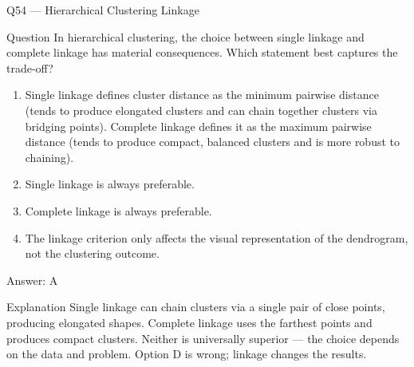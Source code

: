 \documentclass[aspectratio=169,8pt]{beamer}
\begin{document}
	
	\begin{frame}{Q54 --- Hierarchical Clustering Linkage}
		\begin{block}{Question}
			In hierarchical clustering, the choice between single linkage and complete linkage has material consequences. Which statement best captures the trade-off?
		\end{block}
		\begin{enumerate}
			\item Single linkage defines cluster distance as the minimum pairwise distance (tends to produce elongated clusters and can chain together clusters via bridging points). Complete linkage defines it as the maximum pairwise distance (tends to produce compact, balanced clusters and is more robust to chaining).
			\item Single linkage is always preferable.
			\item Complete linkage is always preferable.
			\item The linkage criterion only affects the visual representation of the dendrogram, not the clustering outcome.
		\end{enumerate}
		\begin{exampleblock}{Answer: A}\end{exampleblock}
		\begin{block}{Explanation}
			Single linkage can chain clusters via a single pair of close points, producing elongated shapes. Complete linkage uses the farthest points and produces compact clusters. Neither is universally superior --- the choice depends on the data and problem. Option D is wrong; linkage changes the results.
		\end{block}
	\end{frame}
	
\end{document}
